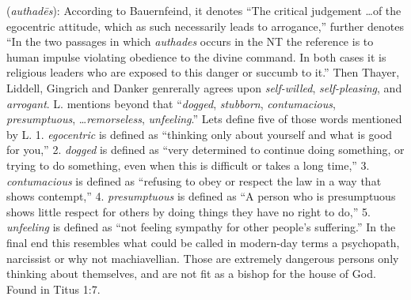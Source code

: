 \item[Machiavellian,]

(\textit{authadēs}):
According to Bauernfeind, it denotes ``The critical judgement \ldots of the egocentric attitude, which as such necessarily leads to arrogance,'' further denotes ``In the two passages in which \emph{authades} occurs in the NT the reference is to human impulse violating obedience to the divine command. In both cases it is religious leaders who are exposed to this danger or succumb to it.'' Then Thayer, Liddell, Gingrich and Danker genrerally agrees upon \emph{self-willed}, \emph{self-pleasing}, and \emph{arrogant}. L. mentions beyond that ``\emph{dogged}, \emph{stubborn}, \emph{contumacious}, \emph{presumptuous}, \ldots \emph{remorseless}, \emph{unfeeling}.'' Lets define five of those words mentioned by L.
1. \emph{egocentric} is defined as ``thinking only about yourself and what is good for you,''
2. \emph{dogged} is defined as ``very determined to continue doing something, or trying to do something, even when this is difficult or takes a long time,''
3. \emph{contumacious} is defined as ``refusing to obey or respect the law in a way that shows contempt,''
4. \emph{presumptuous} is defined as ``A person who is presumptuous shows little respect for others by doing things they have no right to do,''
5. \emph{unfeeling} is defined as ``not feeling sympathy for other people's suffering.''
In the final end this resembles what could be called in modern-day terms a psychopath, narcissist or why not machiavellian. Those are extremely dangerous persons only thinking about themselves, and are not fit as a bishop for the house of God.
Found in Titus 1:7.
